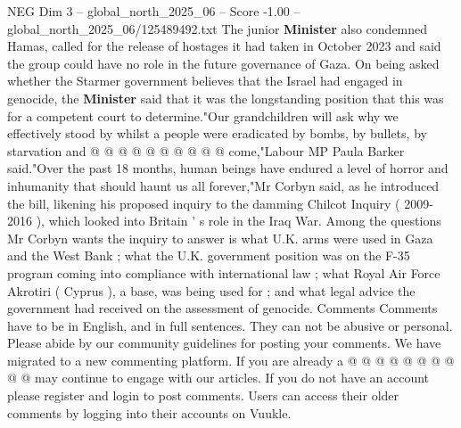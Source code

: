\begin{textsample}{NEG Dim 3 – global\_north\_2025\_06 – Score -1.00 – global\_north\_2025\_06/125489492.txt}
The junior \textbf{Minister} also condemned Hamas, called for the release of hostages it had taken in October 2023 and said the group could have no role in the future governance of Gaza.
On being asked whether the Starmer government believes that the Israel had engaged in genocide, the \textbf{Minister} said that it was the longstanding position that this was for a competent court to determine."Our grandchildren will ask why we effectively stood by whilst a people were eradicated by bombs, by bullets, by starvation and @ @ @ @ @ @ @ @ @ @ come,"Labour MP Paula Barker said."Over the past 18 months, human beings have endured a level of horror and inhumanity that should haunt us all forever,"Mr Corbyn said, as he introduced the bill, likening his proposed inquiry to the damming Chilcot Inquiry ( 2009-2016 ), which looked into Britain ' s role in the Iraq War.
Among the questions Mr Corbyn wants the inquiry to answer is what U.K. arms were used in Gaza and the West Bank ; what the U.K. government position was on the F-35 program coming into compliance with international law ; what Royal Air Force Akrotiri ( Cyprus ), a base, was being used for ; and what legal advice the government had received on the assessment of genocide.
Comments Comments have to be in English, and in full sentences.
They can not be abusive or personal.
Please abide by our community guidelines for posting your comments.
We have migrated to a new commenting platform.
If you are already a @ @ @ @ @ @ @ @ @ @ may continue to engage with our articles.
If you do not have an account please register and login to post comments.
Users can access their older comments by logging into their accounts on Vuukle.

\end{textsample}
